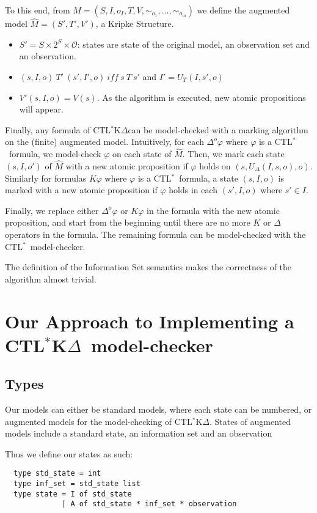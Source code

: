 \documentclass[dvipsnames]{acmart}
\def\ctls{CTL$^{*}$}
\def\ctlskd{CTL$^{*}$K$\Delta$}
\def\K{\mathit{K}}
\def\D#1{\Delta^{#1}}
\def\eqstate#1{\sim_{#1}}
\def\iff{\ \mathit{iff}\ }
\def\UD{U_{\Delta}}
\def\UT{U_T}
\begin{document}
To this end, from $M=(S,I,o_I,T,V,\eqstate{o_1},\dots,\eqstate{o_m})$ we define the augmented model $\hat{M}=(S',T',V')$, a Kripke Structure.
\begin{itemize}
\item $S'=S\times 2^{S}\times \mathcal{O}$: states are state of the original model, an observation set and an observation.
\item $(s,I,o)~T'~(s',I',o)\iff s~T~s'$ and $I'=\UT(I,s',o)$
\item $V'(s,I,o)=V(s)$. As the algorithm is executed, new atomic propositions will appear.
\end{itemize}

Finally, any formula of \ctlskd can be model-checked with a marking algorithm on the (finite) augmented model.
Intuitively, for each $\D{o}\varphi$ where $\varphi$ is a \ctls\ formula, we model-check $\varphi$ on each state of $\hat{M}$.
Then, we mark each state $(s,I,o')$ of $\hat{M}$ with a new atomic proposition if $\varphi$ holds on $(s,\UD(I,s,o),o)$.
Similarly for formulas $\K\varphi$ where $\varphi$ is a \ctls\ formula, a state $(s,I,o)$ is marked with a new atomic proposition if $\varphi$ holds in each $(s',I,o)$ where $s'\in I$.

Finally, we replace either $\D{o}\varphi$ or $\K\varphi$ in the formula with the new atomic proposition, and start from the beginning until there are no more $\K$ or $\Delta$ operators in the formula. The remaining formula can be model-checked with the \ctls\ model-checker.

The definition of the Information Set semantics makes the correctness of the algorithm almost trivial.

\section{Our Approach to Implementing a \ctlskd\ model-checker}

\subsection{Types}
Our models can either be standard models, where each state can be numbered, or augmented models for the model-checking of \ctlskd.
States of augmented models include a standard state, an information set and an observation

Thus we define our states as such:
\begin{lstlisting}
  type std_state = int
  type inf_set = std_state list
  type state = I of std_state
             | A of std_state * inf_set * observation
\end{lstlisting}
\end{document}
